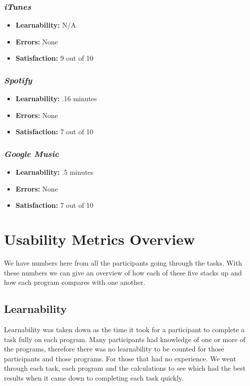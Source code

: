 \documentclass{article}
\begin{document}
\begin{multicols}{2}
\subsubsection{\it iTunes}
\begin{itemize}
	\item {\bf Learnability:} N/A
	\item {\bf Errors:} None
	\item {\bf Satisfaction:} 9 out of 10 
\end{itemize}

\subsubsection{\it Spotify}
\begin{itemize}
	\item {\bf Learnability:} .16 minutes
	\item {\bf Errors:} None
	\item {\bf Satisfaction:} 7 out of 10 
\end{itemize}

\subsubsection{\it Google Music}
\begin{itemize}
\item {\bf Learnability:} .5 minutes
	\item {\bf Errors:} None
	\item {\bf Satisfaction:} 7 out of 10 
\end{itemize}
\end{multicols}

\section{Usability Metrics Overview}
We have numbers here from all the participants going through the tasks. With these numbers we can give an overview of how each of these five stacks up and how each program compares with one another.

\subsection{Learnability}
Learnability was taken down as the time it took for a participant to complete a task fully on each program. Many participants had knowledge of one or more of the programs, therefore there was no learnability to be counted for those participants and those programs. For those that had no experience. %
We went through each task, each program and the calculations to see which had the best results when it came down to completing each task quickly.
\end{document}
